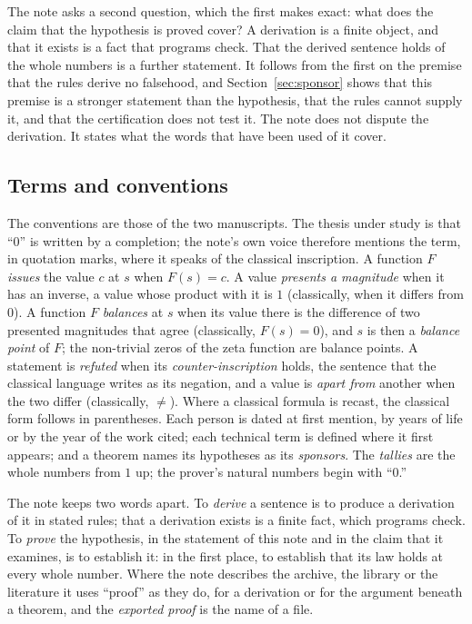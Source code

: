 \documentclass[11pt]{article}
\theoremstyle{definition}
\theoremstyle{remark}
\begin{document}
The note asks a second question, which the first makes exact: what does the claim that the hypothesis is proved cover? A derivation is a finite object, and that it exists is a fact that programs check. That the derived sentence holds of the whole numbers is a further statement. It follows from the first on the premise that the rules derive no falsehood, and Section~\ref{sec:sponsor} shows that this premise is a stronger statement than the hypothesis, that the rules cannot supply it, and that the certification does not test it. The note does not dispute the derivation. It states what the words that have been used of it cover.

\subsection{Terms and conventions}

The conventions are those of the two manuscripts. The thesis under study is that ``0'' is written by a completion; the note's own voice therefore mentions the term, in quotation marks, where it speaks of the classical inscription. A function $F$ \emph{issues} the value $c$ at $s$ when $F(s)=c$. A value \emph{presents a magnitude} when it has an inverse, a value whose product with it is $1$ (classically, when it differs from $0$). A function $F$ \emph{balances} at $s$ when its value there is the difference of two presented magnitudes that agree (classically, $F(s)=0$), and $s$ is then a \emph{balance point} of $F$; the non-trivial zeros of the zeta function are balance points. A statement is \emph{refuted} when its \emph{counter-inscription} holds, the sentence that the classical language writes as its negation, and a value is \emph{apart from} another when the two differ (classically, $\neq$). Where a classical formula is recast, the classical form follows in parentheses. Each person is dated at first mention, by years of life or by the year of the work cited; each technical term is defined where it first appears; and a theorem names its hypotheses as its \emph{sponsors}. The \emph{tallies} are the whole numbers from $1$ up; the prover's natural numbers begin with ``0.''

The note keeps two words apart. To \emph{derive} a sentence is to produce a derivation of it in stated rules; that a derivation exists is a finite fact, which programs check. To \emph{prove} the hypothesis, in the statement of this note and in the claim that it examines, is to establish it: in the first place, to establish that its law holds at every whole number. Where the note describes the archive, the library or the literature it uses ``proof'' as they do, for a derivation or for the argument beneath a theorem, and the \emph{exported proof} is the name of a file.
\end{document}
